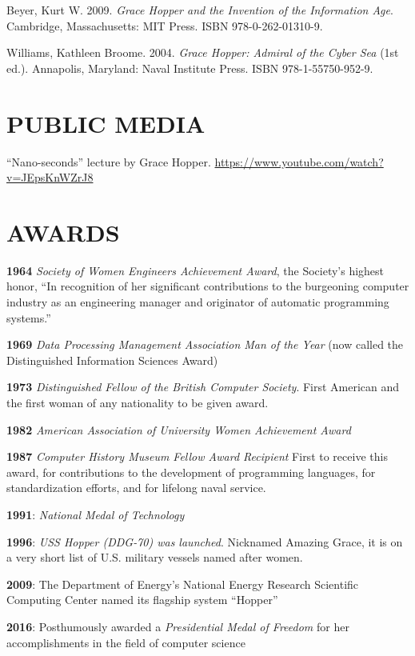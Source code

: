 \documentclass[10pt,]{article}
\begin{document}
Beyer, Kurt W. 2009. \emph{Grace Hopper and the Invention of the
Information Age}. Cambridge, Massachusetts: MIT Press. ISBN
978-0-262-01310-9.

Williams, Kathleen Broome. 2004. \emph{Grace Hopper: Admiral of the
Cyber Sea} (1st ed.). Annapolis, Maryland: Naval Institute Press. ISBN
978-1-55750-952-9.

\hypertarget{public-media}{%
\section{PUBLIC MEDIA}\label{public-media}}

``Nano-seconds'' lecture by Grace Hopper.
\url{https://www.youtube.com/watch?v=JEpsKnWZrJ8}

\hypertarget{awards-1}{%
\section{AWARDS}\label{awards-1}}

\textbf{1964} \emph{Society of Women Engineers Achievement Award}, the
Society's highest honor, ``In recognition of her significant
contributions to the burgeoning computer industry as an engineering
manager and originator of automatic programming systems.''

\textbf{1969} \emph{Data Processing Management Association Man of the
Year} (now called the Distinguished Information Sciences Award)

\textbf{1973} \emph{Distinguished Fellow of the British Computer
Society}. First American and the first woman of any nationality to be
given award.

\textbf{1982} \emph{American Association of University Women Achievement
Award}

\textbf{1987} \emph{Computer History Museum Fellow Award Recipient}
First to receive this award, for contributions to the development of
programming languages, for standardization efforts, and for lifelong
naval service.

\textbf{1991}: \emph{National Medal of Technology}

\textbf{1996}: \emph{USS Hopper (DDG-70) was launched}. Nicknamed
Amazing Grace, it is on a very short list of U.S. military vessels named
after women.

\textbf{2009}: The Department of Energy's National Energy Research
Scientific Computing Center named its flagship system ``Hopper''

\textbf{2016}: Posthumously awarded a \emph{Presidential Medal of
Freedom} for her accomplishments in the field of computer science
\end{document}
